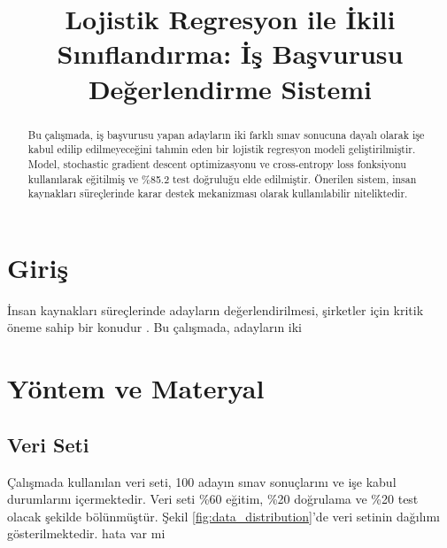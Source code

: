\documentclass[conference]{IEEEtran}
\begin{document}
\title{Lojistik Regresyon ile İkili Sınıflandırma: İş Başvurusu Değerlendirme Sistemi}

\author{
}

\maketitle

\begin{abstract}
Bu çalışmada, iş başvurusu yapan adayların iki farklı sınav sonucuna dayalı
olarak işe kabul edilip edilmeyeceğini tahmin eden bir lojistik regresyon
modeli geliştirilmiştir. Model, stochastic gradient descent optimizasyonu ve
cross-entropy loss fonksiyonu kullanılarak eğitilmiş ve \%85.2 test doğruluğu
elde edilmiştir. Önerilen sistem, insan kaynakları süreçlerinde karar destek
mekanizması olarak kullanılabilir niteliktedir.
\end{abstract}

\section{Giriş}
İnsan kaynakları süreçlerinde adayların değerlendirilmesi, şirketler için
kritik öneme sahip bir konudur \cite{smith2023}. Bu çalışmada, adayların iki

\section{Yöntem ve Materyal}

\subsection{Veri Seti}
Çalışmada kullanılan veri seti, 100 adayın sınav sonuçlarını ve işe kabul
durumlarını içermektedir. Veri seti \%60 eğitim, \%20 doğrulama ve \%20 test
olacak şekilde bölünmüştür. Şekil \ref{fig:data_distribution}'de veri setinin
dağılımı gösterilmektedir. hata var mi
\end{document}
